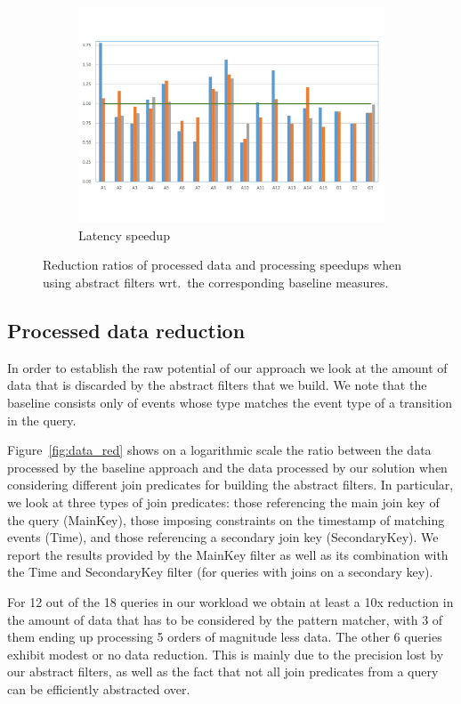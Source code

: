 \begin{figure}[t!]
\begin{subfigure}{\columnwidth}
\includegraphics[clip, trim=0.3cm 2cm 0.4cm 1.8cm,
width=\columnwidth]{graphs/latency_red.pdf}
\caption{Latency speedup}
\label{fig:latency_red}
\end{subfigure}

\caption{Reduction ratios of processed data and processing speedups when using
abstract filters wrt.\ the corresponding baseline measures.}
\end{figure}


\subsection{Processed data reduction}

In order to establish the raw potential of our approach we look at the amount of
data that is discarded by the abstract filters that we build.
We note that the baseline consists only of events whose type matches the event
type of a transition in the query.

Figure~\ref{fig:data_red} shows on a logarithmic scale the ratio between the
data processed by the baseline approach and the data processed by our solution
when considering different join predicates for building the abstract filters.
In particular, we look at three types of join predicates: those referencing
the main join key of the query (MainKey), those imposing constraints on the
timestamp of matching events (Time), and those referencing a secondary join key
(SecondaryKey).
We report the results provided by the MainKey filter as well as its combination
with the Time and SecondaryKey filter (for queries with joins on a secondary
key).
 
For 12 out of the 18 queries in our workload we obtain at least a 10x reduction
in the amount of data that has to be considered by the pattern matcher, with 3
of them ending up processing 5 orders of magnitude less data.
The other 6 queries exhibit modest or no data reduction. This is mainly due to
the precision lost by our abstract filters, as well as the fact that not all
join predicates from a query can be efficiently abstracted over. 

